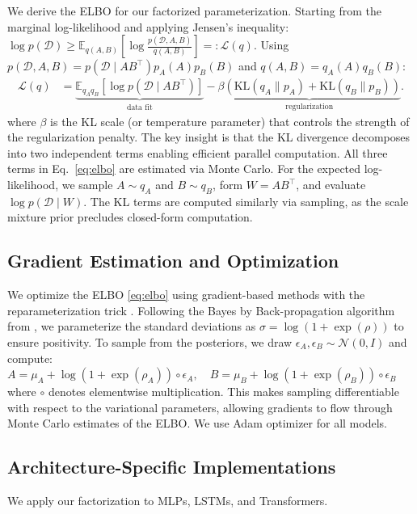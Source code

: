 \documentclass{article}
\theoremstyle{plain}
\theoremstyle{definition}
\theoremstyle{remark}
\begin{document}
We derive the ELBO for our factorized parameterization. Starting from the 
marginal log-likelihood and applying Jensen's inequality: $\log p(\mathcal{D}) \geq \mathbb{E}_{q(A,B)}\left[\log \frac{p(\mathcal{D}, A, B)}{q(A,B)}\right] =: \mathcal{L}(q).$ Using {\small$p(\mathcal{D}, A, B) = p(\mathcal{D} \mid AB^\top) p_A(A) p_B(B)$ 
and $q(A,B) = q_A(A) q_B(B)$:}
{\small
\begin{equation}
\begin{aligned}
\mathcal{L}(q) &= \underbrace{\mathbb{E}_{q_A q_B}[\log p(\mathcal{D} \mid AB^\top)]}_{\text{data fit}} 
 - \underbrace{\beta(\text{KL}(q_A \| p_A) + \text{KL}(q_B \| p_B))}_{\text{regularization}}.
\end{aligned}
\label{eq:elbo}
\end{equation} 
}
where $\beta$ is the KL scale (or temperature parameter) that controls the strength of the regularization penalty.
The key insight is that the KL divergence decomposes into two independent terms enabling efficient parallel computation. All three terms in Eq.~\eqref{eq:elbo} are estimated via Monte Carlo. For the expected log-likelihood, we sample $A \sim q_A$ and $B \sim q_B$, form $W = AB^\top$, and evaluate $\log p(\mathcal{D} \mid W)$. The KL terms are computed similarly via sampling, as the scale mixture prior precludes closed-form computation.

\subsection{Gradient Estimation and Optimization}
\label{sec:method:training}

We optimize the ELBO \eqref{eq:elbo} using gradient-based methods with the 
reparameterization trick \citep{kingma2014auto}. Following the Bayes by Back-propagation algorithm from \citet{blundell2015weight}, 
we parameterize the standard deviations as $\sigma = \log(1 + \exp(\rho))$ to 
ensure positivity. 
To sample from the posteriors, we draw $\epsilon_A, \epsilon_B \sim \mathcal{N}(0, I)$ 
and compute: $A = \mu_A + \log(1 + \exp(\rho_A)) \circ \epsilon_A, \quad 
B = \mu_B + \log(1 + \exp(\rho_B)) \circ \epsilon_B$
where $\circ$ denotes elementwise multiplication. This makes sampling differentiable 
with respect to the variational parameters, allowing gradients to flow through 
Monte Carlo estimates of the ELBO. We use Adam optimizer \citep{kingma2015adam} for all models.
\subsection{Architecture-Specific Implementations}
\label{sec:method:architectures}
We apply our factorization to MLPs, LSTMs, and Transformers.
\end{document}
